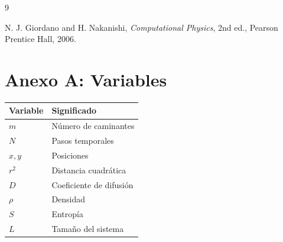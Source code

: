 \documentclass[11pt,a4paper]{article}
\begin{document}
\begin{thebibliography}{9}

N. J. Giordano and H. Nakanishi,
\textit{Computational Physics},
2nd ed., Pearson Prentice Hall, 2006.
\label{Giordano}
\end{thebibliography}

\appendix
\section*{Anexo A: Variables}

\begin{center}
\begin{tabular}{ll}
\hline
Variable & Significado \\
\hline
$m$ & Número de caminantes \\
$N$ & Pasos temporales \\
$x,y$ & Posiciones \\
$r^2$ & Distancia cuadrática \\
$D$ & Coeficiente de difusión \\
$\rho$ & Densidad \\
$S$ & Entropía \\
$L$ & Tamaño del sistema \\
\hline
\end{tabular}
\end{center}
\end{document}
